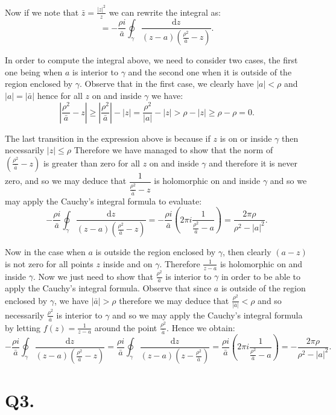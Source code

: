\documentclass[12pt]{article}
\begin{document}
Now if we note that $\bar{z} = \frac{|z|^2}{z}$ we can rewrite the integral as:
\[
	= - \frac{\rho i}{\bar{a}}\oint_\gamma \frac{\text{d}z}{(z - a) (\frac{\rho^2}{\bar{a}} - z)}
.\]

In order to compute the integral above, we need to consider two cases, the first one being when $a$ is interior to
 $\gamma$ and the second one when  it is outside of the region enclosed by $\gamma$.
 Observe that in the first case, we clearly have $|a| < \rho$ and $|a| = |\bar{a}|$ hence for all  $z$ on and inside  $\gamma$ we have:
\[
 \left|\frac{\rho^2}{\bar{a}} - z\right| \ge \left|\frac{\rho^2}{\bar{a}}\right| - |z| =
	 \frac{\rho^2}{|a|} - |z| > \rho - |z| \geq \rho - \rho = 0
.\]

The last transition in the expression above is because if $z$ is on or inside $\gamma$ then necessarily $|z| \leq \rho$
Therefore we have managed to show that the norm of $(\frac{\rho^2}{\bar{a}} - z)$ is greater than zero for all $z$ on
and inside $\gamma$ and therefore it is never zero, and so we may deduce that  $\dfrac{1}{\frac{\rho^2}{\bar{a}} - z}$
is holomorphic on and inside $\gamma$ and so we may apply the Cauchy's integral formula to evaluate:
\[
	- \frac{\rho i}{\bar{a}}\oint_\gamma \frac{\text{d}z}{(z - a) (\frac{\rho^2}{\bar{a}} - z)} =
	- \frac{\rho i}{\bar{a}}\left(2\pi i \frac{1}{\frac{\rho^2}{\bar{a}} - a} \right)
	= \frac{2 \pi \rho}{\rho^2 - |a|^2}
.\]

Now in the case when $a$ is outside the region enclosed by $\gamma$, then clearly $(a - z)$ is not zero for all points
	$z$ inside and on  $\gamma$. Therefore  $\frac{1}{z - a}$ is holomorphic on and inside $\gamma$.
Now we just need to show that  $\frac{\rho^2}{\bar{a}}$ is interior to $\gamma$ in order to be able to apply the
Cauchy's integral formula. Observe that since $a$ is outside of the region enclosed by  $\gamma$, we have
$|\bar{a}| > \rho $ therefore we may deduce that $\frac{\rho^2}{|\bar{a}|} < \rho$ and so necessarily
$\frac{\rho^2}{\bar{a}}$ is interior to $\gamma$ and so we may apply the Cauchy's integral formula by letting  $f(z) = \frac{1}{z - a}$ around the point $\frac{\rho^2}{\bar{a}}$. Hence we obtain:
\[
	- \frac{\rho i}{\bar{a}}\oint_\gamma \frac{\text{d}z}{(z - a) (\frac{\rho^2}{\bar{a}} - z)} =
	 \frac{\rho i}{\bar{a}}\oint_\gamma \frac{\text{d}z}{(z - a) (z - \frac{\rho^2}{\bar{a}})} =
	 \frac{\rho i}{\bar{a}}\left(2\pi i \frac{1}{\frac{\rho^2}{\bar{a}} - a} \right) =
	 - \frac{2 \pi \rho}{\rho^2 - |a|^2}
.\]

\section*{Q3.}
\end{document}
